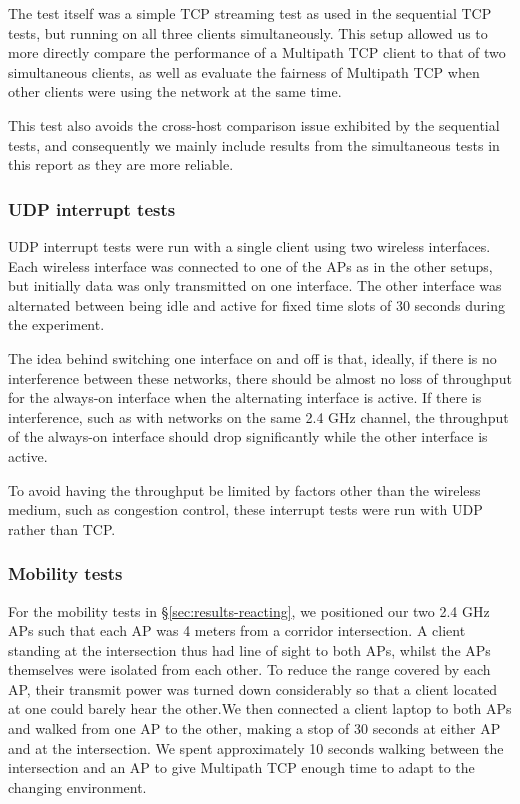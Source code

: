 The test itself was a simple TCP streaming test as used in the sequential TCP
tests, but running on all three clients simultaneously. This setup allowed
us to more directly compare the performance of a Multipath TCP client to that of
two simultaneous clients, as well as evaluate the fairness of Multipath TCP when
other clients were using the network at the same time.

This test also avoids the cross-host comparison issue exhibited by the
sequential tests, and consequently we mainly include results from the
simultaneous tests in this report as they are more reliable.

\subsubsection{UDP interrupt tests}
\label{sec:met:setups:intudp}
UDP interrupt tests were run with a single client using two
wireless interfaces. Each wireless interface was connected to one of the APs as
in the other setups, but initially data was only transmitted on one
interface.  The other interface was alternated between being idle and active
for fixed time slots of 30 seconds during the experiment.

The idea behind switching one interface on and off is
that, ideally, if there is no interference between these networks, there should
be almost no loss of throughput for the always-on interface when the alternating
interface is active. If there is interference, such as with networks on the same
2.4 GHz channel, the throughput of the always-on interface should drop
significantly while the other interface is active.

To avoid having the throughput be limited by factors other than the wireless
medium, such as congestion control, these interrupt tests were run with UDP rather
than TCP.

\subsubsection{Mobility tests}
\label{sec:met:setups:mobility}
For the mobility tests in \S\ref{sec:results-reacting}, we positioned our two
2.4 GHz APs such that each AP was 4 meters from a corridor intersection. 
A client standing at the intersection thus had line of sight to both 
APs, whilst the APs themselves were isolated from each other.
To reduce the range covered by each AP, their transmit power was 
turned down considerably so that a client 
located at one could barely hear the other.\@ We then connected a 
client laptop to both APs and walked from one AP to the other, making a stop of 
30 seconds at either AP and at the intersection. We spent approximately 10 
seconds walking between the intersection and an AP to give Multipath TCP
enough time to adapt to the changing environment.

